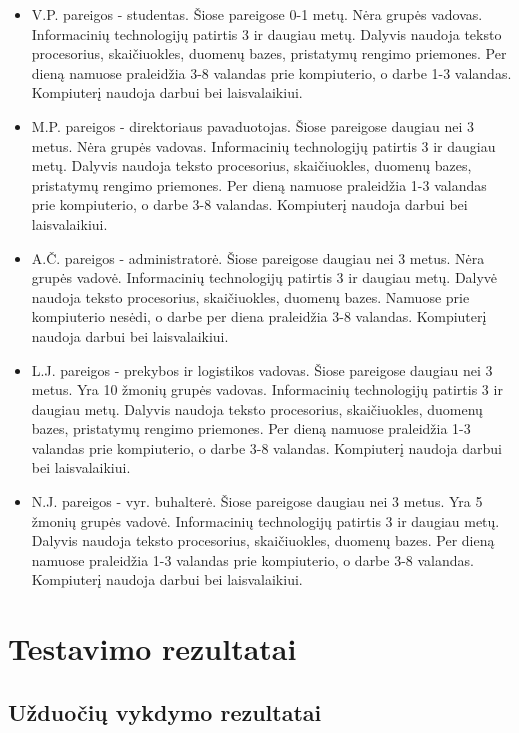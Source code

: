 		\begin{itemize}
			\item V.P. pareigos - studentas. Šiose pareigose 0-1 metų. Nėra grupės vadovas. Informacinių technologijų patirtis 3 ir daugiau metų.
			Dalyvis naudoja teksto procesorius, skaičiuokles, duomenų bazes, pristatymų rengimo priemones.
			Per dieną namuose praleidžia 3-8 valandas prie kompiuterio, o darbe 1-3 valandas.
			Kompiuterį naudoja darbui bei laisvalaikiui.
			\item M.P. pareigos - direktoriaus pavaduotojas. Šiose pareigose daugiau nei 3 metus. Nėra grupės vadovas. Informacinių technologijų patirtis 3 ir daugiau metų.
			Dalyvis naudoja teksto procesorius, skaičiuokles, duomenų bazes, pristatymų rengimo priemones.
			Per dieną namuose praleidžia 1-3 valandas prie kompiuterio, o darbe 3-8 valandas.
			Kompiuterį naudoja darbui bei laisvalaikiui.
			\item A.Č. pareigos - administratorė. Šiose pareigose daugiau nei 3 metus. Nėra grupės vadovė. Informacinių technologijų patirtis 3 ir daugiau metų.
			Dalyvė naudoja teksto procesorius, skaičiuokles, duomenų bazes.
			Namuose prie kompiuterio nesėdi, o darbe per diena praleidžia 3-8 valandas.
			Kompiuterį naudoja darbui bei laisvalaikiui.
			\item L.J. pareigos - prekybos ir logistikos vadovas. Šiose pareigose daugiau nei 3 metus. Yra 10 žmonių grupės vadovas. Informacinių technologijų patirtis 3 ir daugiau metų.
			Dalyvis naudoja teksto procesorius, skaičiuokles, duomenų bazes, pristatymų rengimo priemones.
			Per dieną namuose praleidžia 1-3 valandas prie kompiuterio, o darbe 3-8 valandas.
			Kompiuterį naudoja darbui bei laisvalaikiui.
			\item N.J. pareigos - vyr. buhalterė. Šiose pareigose daugiau nei 3 metus. Yra 5 žmonių grupės vadovė. Informacinių technologijų patirtis 3 ir daugiau metų.
			Dalyvis naudoja teksto procesorius, skaičiuokles, duomenų bazes.
			Per dieną namuose praleidžia 1-3 valandas prie kompiuterio, o darbe 3-8 valandas.
			Kompiuterį naudoja darbui bei laisvalaikiui.
		\end{itemize}
	

\section{Testavimo rezultatai}

	\subsection{Užduočių vykdymo rezultatai}
	
